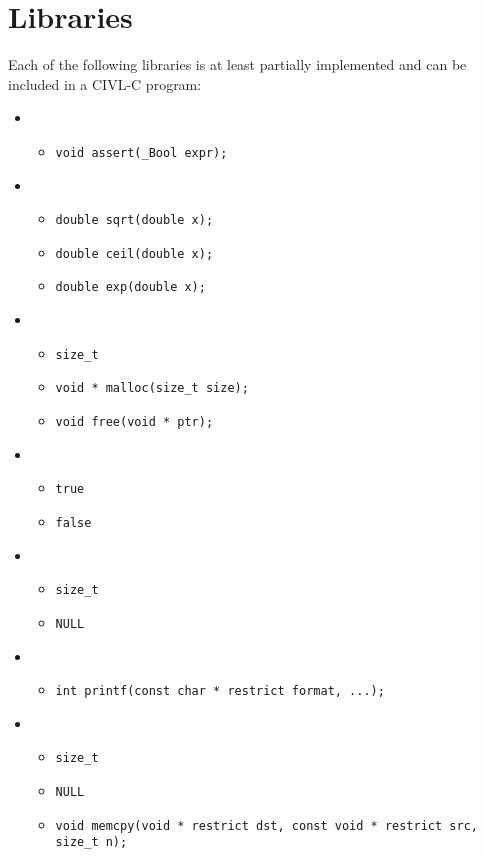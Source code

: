 

\chapter{Libraries}

Each of the following libraries is at least partially implemented and can
be included in a CIVL-C program:
\begin{itemize}
\item {}
  \begin{itemize}
  \item \verb!void assert(_Bool expr);!
  \end{itemize}
\item {}
  \begin{itemize}
  \item \verb!double sqrt(double x);!
  \item \verb!double ceil(double x);!
  \item \verb!double exp(double x);!
  \end{itemize}
\item {}
  \begin{itemize}
  \item \verb!size_t!
  \item \verb!void * malloc(size_t size);!
  \item \verb!void free(void * ptr);!
  \end{itemize}
\item {}
  \begin{itemize}
  \item \verb!true!
  \item \verb!false!
  \end{itemize}
\item {}
  \begin{itemize}
  \item \verb!size_t!
  \item \verb!NULL!
  \end{itemize}
\item {}
  \begin{itemize}
  \item \verb!int printf(const char * restrict format, ...);!
  \end{itemize}
\item {}
  \begin{itemize}
  \item \verb!size_t!
  \item \verb!NULL!
  \item \verb!void memcpy(void * restrict dst, const void * restrict src, size_t n);!
  \end{itemize}
\end{itemize}
